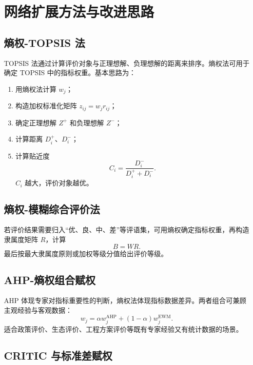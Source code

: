 \documentclass[UTF8,a4paper,12pt]{ctexart}
\begin{document}
\section{网络扩展方法与改进思路}

\subsection{熵权-TOPSIS 法}

TOPSIS 法通过计算评价对象与正理想解、负理想解的距离来排序。熵权法可用于确定 TOPSIS 中的指标权重。基本思路为：
\begin{enumerate}
  \item 用熵权法计算 $w_j$；
  \item 构造加权标准化矩阵 $z_{ij}=w_jr_{ij}$；
  \item 确定正理想解 $Z^+$ 和负理想解 $Z^-$；
  \item 计算距离 $D_i^+$、$D_i^-$；
  \item 计算贴近度
  \begin{equation}
  C_i=\frac{D_i^-}{D_i^++D_i^-}.
  \end{equation}
  $C_i$ 越大，评价对象越优。
\end{enumerate}

\subsection{熵权-模糊综合评价法}

若评价结果需要归入“优、良、中、差”等评语集，可用熵权确定指标权重，再构造隶属度矩阵 $R$，计算
\begin{equation}
 B=W R.
\end{equation}
最后按最大隶属度原则或加权等级分值给出评价等级。

\subsection{AHP-熵权组合赋权}

AHP 体现专家对指标重要性的判断，熵权法体现指标数据差异。两者组合可兼顾主观经验与客观数据：
\begin{equation}
 w_j=\alpha w_j^{\mathrm{AHP}}+(1-\alpha)w_j^{\mathrm{EWM}}.
\end{equation}
适合政策评价、生态评价、工程方案评价等既有专家经验又有统计数据的场景。

\subsection{CRITIC 与标准差赋权}
\end{document}
